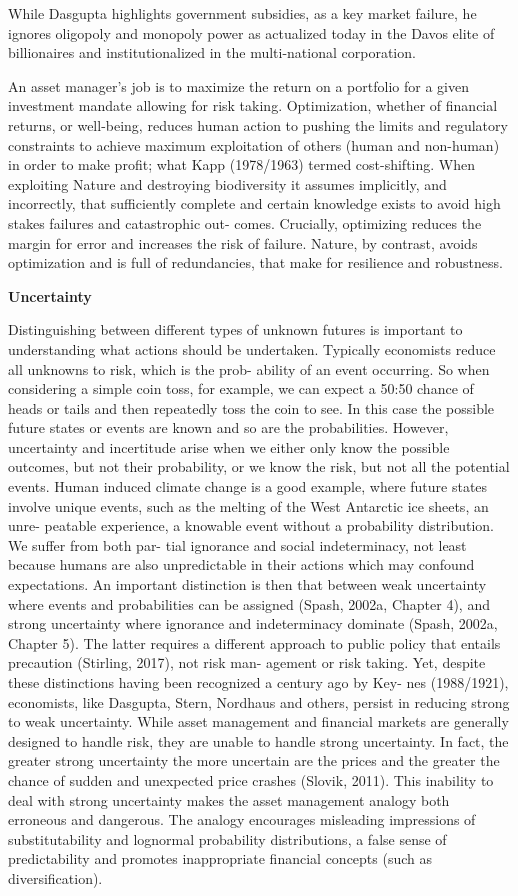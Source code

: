\documentclass[
]{book}
\begin{document}
While Dasgupta highlights government subsidies, as a key market failure,
he ignores oligopoly and monopoly power as actualized today in the Davos elite of billionaires and
institutionalized in the multi-national corporation.

An asset manager's job is to maximize the return on a portfolio for a given investment mandate
allowing for risk taking. Optimization, whether of financial returns, or well-being, reduces human
action to pushing the limits and regulatory constraints to achieve maximum exploitation of others
(human and non-human) in order to make profit; what Kapp (1978/1963) termed cost-shifting.
When exploiting Nature and destroying biodiversity it assumes implicitly, and incorrectly, that
sufficiently complete and certain knowledge exists to avoid high stakes failures and catastrophic out-
comes. Crucially, optimizing reduces the margin for error and increases the risk of failure. Nature, by
contrast, avoids optimization and is full of redundancies, that make for resilience and robustness.

\textbf{Uncertainty}

Distinguishing between different types of unknown futures is important to understanding what
actions should be undertaken. Typically economists reduce all unknowns to risk, which is the prob-
ability of an event occurring. So when considering a simple coin toss, for example, we can expect a
50:50 chance of heads or tails and then repeatedly toss the coin to see. In this case the possible
future states or events are known and so are the probabilities. However, uncertainty and incertitude
arise when we either only know the possible outcomes, but not their probability, or we know the
risk, but not all the potential events. Human induced climate change is a good example, where
future states involve unique events, such as the melting of the West Antarctic ice sheets, an unre-
peatable experience, a knowable event without a probability distribution. We suffer from both par-
tial ignorance and social indeterminacy, not least because humans are also unpredictable in their
actions which may confound expectations. An important distinction is then that between weak
uncertainty where events and probabilities can be assigned (Spash, 2002a, Chapter 4), and strong
uncertainty where ignorance and indeterminacy dominate (Spash, 2002a, Chapter 5). The latter
requires a different approach to public policy that entails precaution (Stirling, 2017), not risk man-
agement or risk taking. Yet, despite these distinctions having been recognized a century ago by Key-
nes (1988/1921), economists, like Dasgupta, Stern, Nordhaus and others, persist in reducing strong
to weak uncertainty. While asset management and financial markets are generally designed to
handle risk, they are unable to handle strong uncertainty. In fact, the greater strong uncertainty
the more uncertain are the prices and the greater the chance of sudden and unexpected price
crashes (Slovik, 2011). This inability to deal with strong uncertainty makes the asset management
analogy both erroneous and dangerous. The analogy encourages misleading impressions of
substitutability and lognormal probability distributions, a false sense of predictability and promotes
inappropriate financial concepts (such as diversification).
\end{document}
